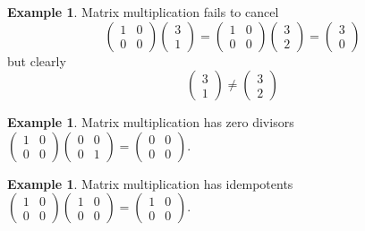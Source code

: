 \documentclass[12pt]{amsart}
\theoremstyle{definition}
\newtheorem{example}[theorem]{Example}
\begin{document}
\begin{example} Matrix multiplication fails to cancel
$$\left(\begin{array}{cc} 1 & 0 \\ 0 & 0 \end{array}\right) \left(\begin{array}{c} 3 \\  1 \end{array}\right) = \left(\begin{array}{cc} 1 & 0 \\ 0 & 0 \end{array}\right) \left(\begin{array}{c} 3 \\  2 \end{array}\right) = \left(\begin{array}{c} 3 \\  0 \end{array}\right)$$
but clearly
$$\left(\begin{array}{c} 3 \\  1 \end{array}\right) \neq \left(\begin{array}{c} 3 \\  2 \end{array}\right)$$
\end{example}

\begin{example} Matrix multiplication has zero divisors $\left(\begin{array}{cc} 1 & 0 \\ 0 & 0 \end{array}\right) \left(\begin{array}{cc} 0 & 0 \\ 0 & 1 \end{array}\right) = \left(\begin{array}{cc} 0 & 0 \\ 0 & 0 \end{array}\right)$.
\end{example}

\begin{example} Matrix multiplication has idempotents $\left(\begin{array}{cc} 1 & 0 \\ 0 & 0 \end{array}\right) \left(\begin{array}{cc} 1 & 0 \\ 0 & 0 \end{array}\right) = \left(\begin{array}{cc} 1 & 0 \\ 0 & 0 \end{array}\right)$.
\end{example}
\end{document}
